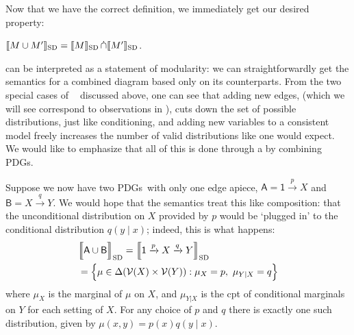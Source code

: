 \documentclass{article}
\newcommand\SD{_{\text{SD}}}
\DeclareMathOperator\dcap{\mathop{\dot\cap}}
\newcommand{\bmu}{\boldsymbol{\mu}}
\newcommand{\V}{\mathcal V}
\newcommand{\Ed}{\mathcal E}
\newcommand{\MN}{PDG}
\newcommand{\MNs}{\MN s}
\numberwithin{equation}{section}
\begin{document}
\begin{notfocus}
	
	Now that we have the correct definition, we immediately get our desired property:
	
	\begin{prop}\label{prop:union-set-semantics}
		$\bbr{M \cup M'}\SD = \bbr{M}\SD \dcap \bbr{M'}\SD$.
	\end{prop}

	 can be interpreted as a statement of modularity: we can straightforwardly get the semantics for a combined diagram based only on its counterparts. 
	From the two special cases of $\dcap$ discussed above, one can see that adding new edges, (which we will see correspond to observations in ), cuts down the set of possible distributions, just like conditioning, and adding new variables to a consistent model freely increases the number of valid distributions like one would expect. We would like to emphasize that all of this is done through a by combining \MNs.
	
	\begin{example}\label{ex:sd-compose-unconditional}
		Suppose we now have two \MNs\ with only one edge apiece, $\mathsf A = {\mathsf 1} \xrightarrow{p} X$ and $\mathsf B = X \xrightarrow{q} Y$. We would hope that the semantics treat this like composition: that the unconditional distribution on $X$ provided by $p$ would be `plugged in' to the conditional distribution $q(y \mid x)$; indeed, this is what happens:
		\begin{align*}
			&\bbr[\Big]{{\sf A \cup B}}\SD = \bbr[\Big]{{\mathsf 1} \xrightarrow{p} X \xrightarrow{q} Y}\SD \\
				&= \Big\{  \mu \in \Delta(\V(X) \times \V(Y)) : \mu_X = p,~\mu_{Y|X} = q \Big\} 
		\end{align*}
		where $\mu_X$ is the marginal of $\mu$ on $X$, and $\mu_{Y|X}$ is the cpt of conditional marginals on $Y$ for each setting of $X$.
		For any choice of $p$ and $q$ there is exactly one such distribution, given by $\mu(x,y) = p(x) q(y \mid x)$.
	\end{example}





\end{notfocus}
\end{document}
